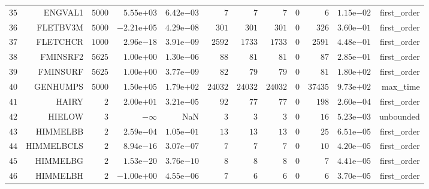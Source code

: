 \begin{longtable}{rrrrrrrrrrrr}
  \(    35\) & ENGVAL1 & \(  5000\) & \( 5.55\)e\(+03\) & \( 6.42\)e\(-03\) & \(     7\) & \(     7\) & \(     7\) & \(     0\) & \(     6\) & \( 1.15\)e\(-02\) & first\_order \\
  \(    36\) & FLETBV3M & \(  5000\) & \(-2.21\)e\(+05\) & \( 4.29\)e\(-08\) & \(   301\) & \(   301\) & \(   301\) & \(     0\) & \(   326\) & \( 3.60\)e\(-01\) & first\_order \\
  \(    37\) & FLETCHCR & \(  1000\) & \( 2.96\)e\(-18\) & \( 3.91\)e\(-09\) & \(  2592\) & \(  1733\) & \(  1733\) & \(     0\) & \(  2591\) & \( 4.48\)e\(-01\) & first\_order \\
  \(    38\) & FMINSRF2 & \(  5625\) & \( 1.00\)e\(+00\) & \( 1.30\)e\(-06\) & \(    88\) & \(    81\) & \(    81\) & \(     0\) & \(    87\) & \( 2.85\)e\(-01\) & first\_order \\
  \(    39\) & FMINSURF & \(  5625\) & \( 1.00\)e\(+00\) & \( 3.77\)e\(-09\) & \(    82\) & \(    79\) & \(    79\) & \(     0\) & \(    81\) & \( 1.80\)e\(+02\) & first\_order \\
  \(    40\) & GENHUMPS & \(  5000\) & \( 1.50\)e\(+05\) & \( 1.79\)e\(+02\) & \( 24032\) & \( 24032\) & \( 24032\) & \(     0\) & \( 37435\) & \( 9.73\)e\(+02\) & max\_time \\
  \(    41\) & HAIRY & \(     2\) & \( 2.00\)e\(+01\) & \( 3.21\)e\(-05\) & \(    92\) & \(    77\) & \(    77\) & \(     0\) & \(   198\) & \( 2.60\)e\(-04\) & first\_order \\
  \(    42\) & HIELOW & \(     3\) & \(-\infty\) &       NaN & \(     3\) & \(     3\) & \(     3\) & \(     0\) & \(    16\) & \( 5.23\)e\(-03\) & unbounded \\
  \(    43\) & HIMMELBB & \(     2\) & \( 2.59\)e\(-04\) & \( 1.05\)e\(-01\) & \(    13\) & \(    13\) & \(    13\) & \(     0\) & \(    25\) & \( 6.51\)e\(-05\) & first\_order \\
  \(    44\) & HIMMELBCLS & \(     2\) & \( 8.94\)e\(-16\) & \( 3.07\)e\(-07\) & \(     7\) & \(     7\) & \(     7\) & \(     0\) & \(    10\) & \( 4.20\)e\(-05\) & first\_order \\
  \(    45\) & HIMMELBG & \(     2\) & \( 1.53\)e\(-20\) & \( 3.76\)e\(-10\) & \(     8\) & \(     8\) & \(     8\) & \(     0\) & \(     7\) & \( 4.41\)e\(-05\) & first\_order \\
  \(    46\) & HIMMELBH & \(     2\) & \(-1.00\)e\(+00\) & \( 4.55\)e\(-06\) & \(     7\) & \(     6\) & \(     6\) & \(     0\) & \(     6\) & \( 3.70\)e\(-05\) & first\_order \\

\end{longtable}
